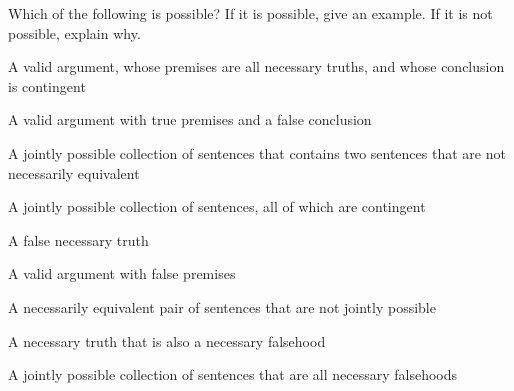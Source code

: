 \problempart
Which of the following is possible? If it is possible, give an example. If it is not possible, explain why.

\begin{earg}
\item A valid argument, whose premises are all necessary truths, and whose conclusion is contingent
\item A valid argument with true premises and a false conclusion
\item A jointly possible collection of sentences that contains two sentences that are not necessarily equivalent
\item A jointly possible collection of sentences, all of which are contingent
\item A false necessary truth
\item A valid argument with false premises
\item A necessarily equivalent pair of sentences that are not jointly possible
\item A necessary truth that is also a necessary falsehood
\item A jointly possible collection of sentences that are all necessary falsehoods
\end{earg}
